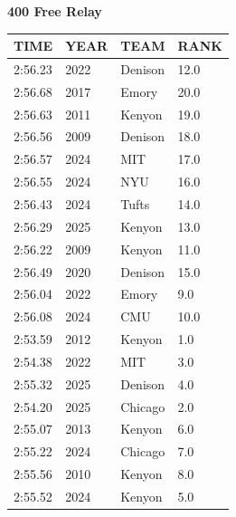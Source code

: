 \begin{table}[H]
\centering
\begin{minipage}[t]{0.6\textwidth}
\centering
\textbf{400 Free Relay}\\[0.1cm]
\begin{tabular}{@{}p{1.8cm}p{1.2cm}p{1.4cm}p{0.8cm}@{}}
\hline
    \textbf{TIME} & \textbf{YEAR} & \textbf{TEAM} & \textbf{RANK} \\
\hline
    2:56.23 & 2022 & Denison & 12.0 \\
    2:56.68 & 2017 & Emory & 20.0 \\
    2:56.63 & 2011 & Kenyon & 19.0 \\
    2:56.56 & 2009 & Denison & 18.0 \\
    2:56.57 & 2024 & MIT & 17.0 \\
    2:56.55 & 2024 & NYU & 16.0 \\
    2:56.43 & 2024 & Tufts & 14.0 \\
    2:56.29 & 2025 & Kenyon & 13.0 \\
    2:56.22 & 2009 & Kenyon & 11.0 \\
    2:56.49 & 2020 & Denison & 15.0 \\
    2:56.04 & 2022 & Emory & 9.0 \\
    2:56.08 & 2024 & CMU & 10.0 \\
    2:53.59 & 2012 & Kenyon & 1.0 \\
    2:54.38 & 2022 & MIT & 3.0 \\
    2:55.32 & 2025 & Denison & 4.0 \\
    2:54.20 & 2025 & Chicago & 2.0 \\
    2:55.07 & 2013 & Kenyon & 6.0 \\
    2:55.22 & 2024 & Chicago & 7.0 \\
    2:55.56 & 2010 & Kenyon & 8.0 \\
    2:55.52 & 2024 & Kenyon & 5.0 \\
\hline
\end{tabular}
\end{minipage}
\end{table}

